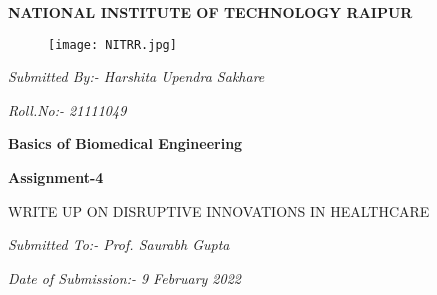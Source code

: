 \documentclass[12pt,a4paper]{article}
\begin{document}

\begin{center}
\textbf{NATIONAL INSTITUTE OF TECHNOLOGY RAIPUR}
\end{center}

\begin{figure}[h]
\centering
\texttt{[image: NITRR.jpg]}
\end{figure}

\hspace{1cm}

\begin{center}
\textit{\large Submitted By:- Harshita Upendra Sakhare}
\end{center}


\hspace{1cm}


\begin{center}
\textsl{Roll.No:- 21111049}
\end{center}

\hspace{1cm}


\begin{center}
\textbf{\large Basics of Biomedical Engineering}
\end{center}

\begin{center}
\textbf{\large Assignment-4}
\end{center}

\hspace{1cm}

\begin{center}
\textsc{WRITE UP ON DISRUPTIVE INNOVATIONS IN HEALTHCARE}
\end{center}



\hspace{1cm}

\begin{center}
\textit{\large Submitted To:- Prof. Saurabh Gupta}
\end{center}

\hspace{1cm}

\begin{center}
\textsl{Date of Submission:- 9 February 2022 }
\end{center}
\end{document}
